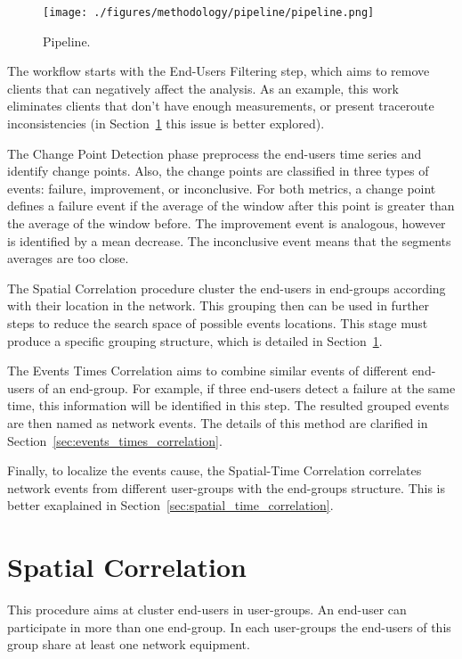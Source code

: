 \begin{figure}[H]
    \centering
    \texttt{[image: ./figures/methodology/pipeline/pipeline.png]}
    \caption{Pipeline.}
\label{fig:pipeline}
\end{figure}%

The workflow starts with the End-Users Filtering step,
which aims to remove clients that can negatively affect the analysis.
As an example, this work eliminates clients
that don't have enough measurements, or present
traceroute inconsistencies (in Section~\ref{sec:spatial_correlation}
this issue is better explored).

The Change Point Detection phase preprocess the end-users time series and
identify change points.
Also, the change points are classified in three types of events: failure,
improvement, or inconclusive. For both metrics, a change point defines a
failure event if the average of the window after this point is greater than the
average of the window before. The improvement event is analogous, however is
identified by a mean decrease.
The inconclusive event means that the segments averages are too close.

The Spatial Correlation procedure cluster the end-users in end-groups
according with their location in the network. This grouping then can be used in
further steps to reduce the search space of possible events locations.
This stage must produce a specific grouping structure, which is detailed in
Section~\ref{sec:spatial_correlation}.

The Events Times Correlation aims to combine similar events of different
end-users of an end-group. For example, if three end-users detect a failure at
the same time, this information will be identified in this step. The resulted
grouped events are then named as network events.
The details of this method are clarified in
Section~\ref{sec:events_times_correlation}.

Finally, to localize the events cause, the Spatial-Time Correlation
correlates network events
from different user-groups with the end-groups structure.
This is better exaplained in Section~\ref{sec:spatial_time_correlation}.

\section{Spatial Correlation}
\label{sec:spatial_correlation}

This procedure aims at cluster end-users in user-groups.
An end-user can
participate in more than one end-group.
In each user-groups the end-users of this group share at least one network
equipment.


